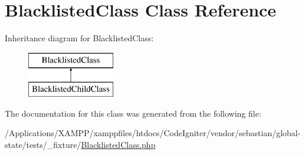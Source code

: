 \hypertarget{class_sebastian_bergmann_1_1_global_state_1_1_test_fixture_1_1_blacklisted_class}{}\section{Blacklisted\+Class Class Reference}
\label{class_sebastian_bergmann_1_1_global_state_1_1_test_fixture_1_1_blacklisted_class}
Inheritance diagram for Blacklisted\+Class\+:\begin{figure}[H]
\begin{center}
\leavevmode
\includegraphics[height=2.000000cm]{class_sebastian_bergmann_1_1_global_state_1_1_test_fixture_1_1_blacklisted_class}
\end{center}
\end{figure}


The documentation for this class was generated from the following file\+:\begin{DoxyCompactItemize}
\item 
/\+Applications/\+X\+A\+M\+P\+P/xamppfiles/htdocs/\+Code\+Igniter/vendor/sebastian/global-\/state/tests/\+\_\+fixture/\mbox{\hyperlink{_blacklisted_class_8php}{Blacklisted\+Class.\+php}}\end{DoxyCompactItemize}
